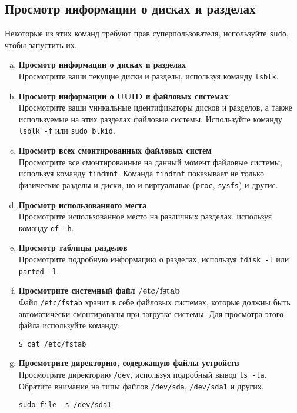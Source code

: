 \documentclass{article}
\begin{document}
\subsection{Просмотр информации о дисках и разделах}
Некоторые из этих команд требуют прав суперпользователя, используйте \texttt{sudo}, чтобы запустить их.
\begin{enumerate}[a.]
\item \textbf{Просмотр информации о дисках и разделах}\\
Просмотрите ваши текущие диски и разделы, используя команду \texttt{lsblk}.

\item \textbf{Просмотр информации о UUID и файловых системах}\\
Просмотрите ваши уникальные идентификаторы дисков и разделов, а также используемые на этих разделах файловые системы. Используйте команду \texttt{lsblk -f} или \texttt{sudo blkid}.

\item \textbf{Просмотр всех смонтированных файловых систем}\\
Просмотрите все смонтированные на данный момент файловые системы, используя команду \texttt{findmnt}. Команда \texttt{findmnt} показывает не только физические разделы и диски, но и виртуальные (\texttt{proc}, \texttt{sysfs}) и другие.

\item \textbf{Просмотр использованного места}\\
Просмотрите использованное место на различных разделах, используя команду \texttt{df -h}.

\item \textbf{Просмотр таблицы разделов}\\
Просмотрите подробную информацию о разделах, используя \texttt{fdisk -l} или \texttt{parted -l}.

\item \textbf{Просмотрите системный файл /etc/fstab}\\
Файл \texttt{/etc/fstab} хранит в себе файловых системах, которые должны быть автоматически смонтированы при загрузке системы. Для просмотра этого файла используйте команду:
\begin{lstlisting}
$ cat /etc/fstab
\end{lstlisting}

\item \textbf{Просмотрите директорию, содержащую файлы устройств}\\
Просмотрите директорию \texttt{/dev}, используя подробный вывод \texttt{ls -la}. Обратите внимание на типы файлов \texttt{/dev/sda}, \texttt{/dev/sda1} и других.
\begin{lstlisting}
sudo file -s /dev/sda1
\end{lstlisting}
\end{enumerate}
\end{document}
